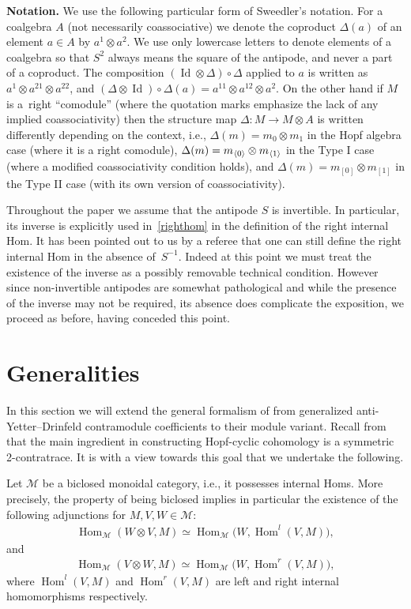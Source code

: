 \documentclass[pdftex]{sigma}
\newcommand{\ns}[1]{~\hspace{-3pt}_{\left<#1\right>}}
\def\ot{\otimes}
\numberwithin{equation}{section}
\begin{document}
\textbf{Notation.} We use the following particular form of Sweedler's notation. For a coalgebra $A$ (not necessarily coassociative) we denote the coproduct $\Delta(a)$ of an element $a\in A$ by $a^1\ot a^2$. We use only lowercase letters to denote elements of a coalgebra so that $S^2$ always means the square of the antipode, and never a part of a coproduct. The composition $(\operatorname{Id}\ot\Delta)\circ\Delta$ applied to $a$ is written as $a^1\ot a^{21}\ot a^{22}$, and $(\Delta\ot \operatorname{Id})\circ\Delta(a)=a^{11}\ot a^{12}\ot a^2$. On the other hand if $M$ is a~right ``comodule'' (where the quotation marks emphasize the lack of any implied coassociativity) then the structure map $\Delta\colon M\to M\ot A$ is written differently depending on the context, i.e., $\Delta(m)=m_{0}\ot m_{1}$ in the Hopf algebra case (where it is a right comodule), $\Delta(m)=m\ns{0}\ot m\ns{1}$ in the Type I case (where a modified coassociativity condition holds), and $\Delta(m)=m_{[0]} \otimes m_{[1]}$ in the Type II case (with its own version of coassociativity).

\begin{Remark}Throughout the paper we assume that the antipode $S$ is invertible. In particular, its inverse is explicitly used in~\eqref{righthom} in the definition of the right internal Hom. It has been pointed out to us by a referee that one can still define the right internal Hom in the absence of~$S^{-1}$. Indeed at this point we must treat the existence of the inverse as a possibly removable technical condition. However since non-invertible antipodes are somewhat pathological and while the presence of the inverse may not be required, its absence does complicate the exposition, we proceed as before, having conceded this point.
 \end{Remark}

\section{Generalities}\label{s:General}

In this section we will extend the general formalism of \cite{sk} from generalized anti-Yetter--Drinfeld contramodule coefficients to their module variant. Recall from \cite{hks} that the main ingredient in constructing Hopf-cyclic cohomology is a symmetric 2-contratrace. It is with a view towards this goal that we undertake the following.

 Let $\mathcal{M}$ be a biclosed monoidal category, i.e., it possesses internal Homs. More precisely, the property of being biclosed implies in particular the existence of the following adjunctions
 for $M, V, W\in \mathcal{M}$:
 \begin{gather*}
 \operatorname{Hom}_\mathcal{M} (W\otimes V, M) \simeq \operatorname{Hom}_\mathcal{M} \big(W, \operatorname{Hom}^l(V,M)\big),
 \end{gather*}
 and{\samepage
 \begin{gather*}
 \operatorname{Hom}_\mathcal{M} (V\otimes W, M) \simeq \operatorname{Hom}_\mathcal{M} \big(W, \operatorname{Hom}^r(V,M)\big),
 \end{gather*}
 where $\operatorname{Hom}^l(V,M) $ and $\operatorname{Hom}^r(V,M)$ are left and right internal homomorphisms respectively.}
\end{document}
